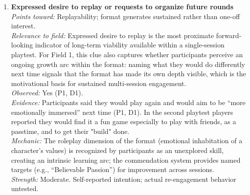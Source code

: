 \documentclass[12pt]{article}
\begin{document}
\begin{enumerate}
\item \textbf{Expressed desire to replay or requests to organize future rounds}\\
\textit{Points toward:} Replayability; format generates sustained rather than one-off interest.\\
\textit{Relevance to field:} Expressed desire to replay is the most proximate forward-looking indicator of long-term viability available within a single-session playtest. For Field 1, this clue also captures whether participants perceive an ongoing growth arc within the format: naming what they would do differently next time signals that the format has made its own depth visible, which is the motivational basis for sustained multi-session engagement.\\
\textit{Observed:} Yes (P1, D1).\\
\textit{Evidence:} Participants said they would play again and would aim to be ``more emotionally immersed'' next time (P1, D1). In the second playtest players reported they would find it a fun game especially to play with friends, as a passtime, and to get their "build" done.\\
\textit{Mechanic:} The roleplay dimension of the format (emotional inhabitation of a character's values) is recognized by participants as an unexplored skill, creating an intrinsic learning arc; the commendation system provides named targets (e.g., ``Believable Passion'') for improvement across sessions.\\
\textit{Strength:} Moderate. Self-reported intention; actual re-engagement behavior untested.


\end{enumerate}
\end{document}
